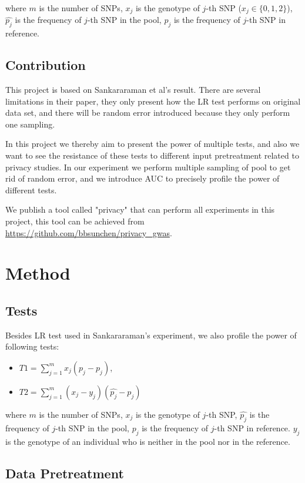 \documentclass[12pt, singlespace]{article}
\begin{document}
where $m$ is the number of SNPs, $x_j$ is the genotype of $j$-th SNP ($x_j\in \{0,1,2\}$), $\hat{p_j}$ is the frequency of $j$-th SNP in the pool, $p_j$ is the frequency of $j$-th SNP in reference. 
\subsection{Contribution}

This project is based on Sankararaman et al's result\cite{sankararaman2009genomic}. There are several limitations in their paper, they only present how the LR test performs on original data set, and there will be random error introduced because they only perform one sampling.

 In this project we thereby aim to present the power of multiple tests, and also we want to see the resistance of these tests to different input pretreatment related to privacy studies. In our experiment we perform multiple sampling of pool to get rid of random error, and we introduce AUC to precisely profile the power of different tests.
 
We publish a tool called "privacy" that can perform all experiments in this project, this tool can be achieved from \url{https://github.com/bbsunchen/privacy_gwas}.

\section{Method}

\subsection{Tests}
Besides LR test used in Sankararaman's experiment, we also profile the power of following tests:
\begin{itemize}

\item$T1=\sum_{j=1}^{m}x_j(\hat{p_j}-p_j)$,

\item$T2=\sum_{j=1}^{m}(x_j-y_j)(\hat{p_j}-p_j)$

\end{itemize}
where $m$ is the number of SNPs, $x_j$ is the genotype of $j$-th SNP, $\hat{p_j}$ is the frequency of $j$-th SNP in the pool, $p_j$ is the frequency of $j$-th SNP in reference. $y_j$ is the genotype of an individual who is neither in the pool nor in the reference.

\subsection{Data Pretreatment}
\end{document}
